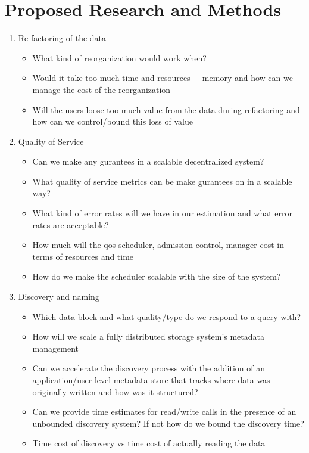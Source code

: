 \section{Proposed Research and Methods}
\label{subsec:challenges}
\label{sec:proposed}

\begin{enumerate}
\item Re-factoring of the data
  \begin{itemize}
  \item What kind of reorganization would work when?
  \item Would it take too much time and resources + memory and how can we
    manage the cost of the reorganization
  \item Will the users loose too much value from the data during refactoring
    and how can we control/bound this loss of value
  \end{itemize}
\item Quality of Service
  \begin{itemize}
  \item Can we make any gurantees in a scalable decentralized system?
  \item What quality of service metrics can be make gurantees on in a scalable
    way?
  \item What kind of error rates will we have in our estimation and what error
    rates are acceptable?
  \item How much will the qos scheduler, admission control, manager cost in
    terms of resources and time
  \item How do we make the scheduler scalable with the size of the system?
  \end{itemize}
\item Discovery and naming
  \begin{itemize}
  \item Which data block and what quality/type do we respond to a query
    with?
  \item How will we scale a fully distributed storage system's metadata
    management
  \item Can we accelerate the discovery process with the addition of an
    application/user level metadata store that tracks where data was
    originally written and how was it structured?
  \item Can we provide time estimates for read/write calls in the presence of
    an unbounded discovery system? If not how do we bound the discovery time?
  \item Time cost of discovery vs time cost of actually reading the data

\end{itemize}
\end{enumerate}
